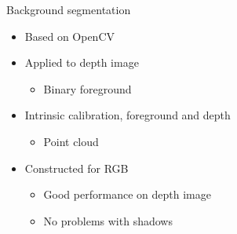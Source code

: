 
\begin{frame}{Background segmentation}
	\begin{itemize}

	\item Based on OpenCV
	\item Applied to depth image
	\begin{itemize}
	\item Binary foreground
    \end{itemize}	
	\item Intrinsic calibration, foreground and depth
	\begin{itemize}
	\item Point cloud
	\end{itemize}
	\item Constructed for RGB
	\begin{itemize}
	\item Good performance on depth image
	\item No problems with shadows 
	\end{itemize}
	\end{itemize}
\end{frame}
